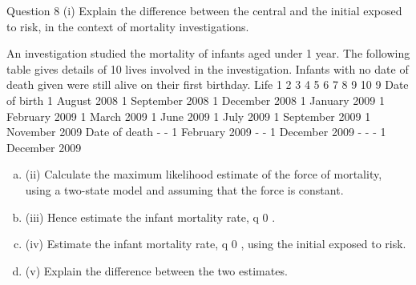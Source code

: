 \documentclass[a4paper,12pt]{article}
\begin{document}
\begin{enumerate}
Question 8
(i)
Explain the difference between the central and the initial exposed to
risk, in the context of mortality investigations.

An investigation studied the mortality of infants aged under 1 year. The following table gives details of 10 lives involved in the investigation. Infants with no date of
death given were still alive on their first birthday.
Life
1
2
3
4
5
6
7
8
9
10
9
Date of birth
1 August 2008
1 September 2008
1 December 2008
1 January 2009
1 February 2009
1 March 2009
1 June 2009
1 July 2009
1 September 2009
1 November 2009
Date of death
-
-
1 February 2009
-
-
1 December 2009
-
-
-
1 December 2009

\begin{enumerate}[(a)]
\item (ii) Calculate the maximum likelihood estimate of the force of mortality, using a
two-state model and assuming that the force is constant.
\item 
(iii) Hence estimate the infant mortality rate, q 0 .
\item 
(iv) Estimate the infant mortality rate, q 0 , using the initial exposed to risk.
\item 
(v) Explain the difference between the two estimates.
\end{enumerate}
\newpage


\end{enumerate}
\end{document}
